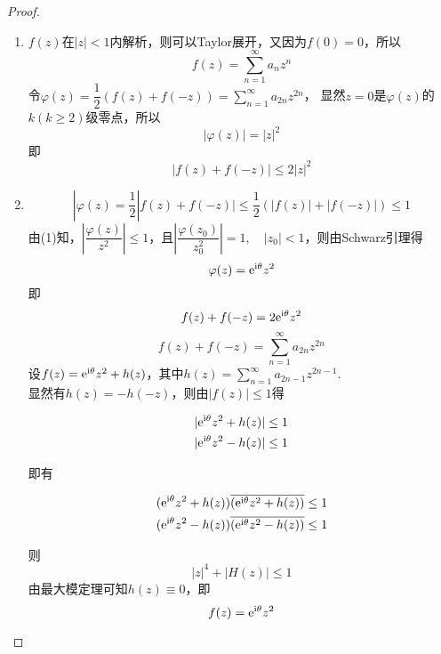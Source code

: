 \begin{proof}
    
    \begin{enumerate}
        
        \item
            $f(z)$在$|z| < 1$内解析，则可以\textup{Taylor}展开，又因为$f(0) = 0$，所以
            $$ f(z) = \sum\limits_{n = 1}^{\infty}{a_nz^n}$$
            令$\varphi(z) = \dfrac{1}{2} (f(z) + f(-z)) = \sum\limits_{n = 1}^{\infty}{a_{2n}z^{2n}}$，
            显然$z = 0$是$\varphi(z)$的$k(k \geq 2)$级零点，所以
            $$|\varphi(z)| = |z|^2$$
            即
            $$|f(z) + f(-z)| \leq 2|z|^2$$

        \item 
            $$|\varphi(z) = \dfrac{1}{2} |f(z) + f(-z)| \leq \dfrac{1}{2} (|f(z)| + |f(-z)|) \leq 1$$
            由\textup{(1)}知，$\left| \dfrac{\varphi(z)}{z^2} \right| \leq 1$，且$\left| \dfrac{\varphi(z_0)}{z_0^2} \right| = 1, \quad |z_0| < 1$，则由\textup{Schwarz}引理得
            $$\varphi(z) = \mathrm{e}^{\mathrm{i}\theta} z^2$$
            即
            $$f(z) + f(-z) = 2\mathrm{e}^{\mathrm{i}\theta} z^2$$
            $$f(z) + f(-z) = \sum\limits_{n = 1}^{\infty}{a_{2n}z^{2n}}$$
            设$f(z) = \mathrm{e}^{\mathrm{i}\theta} z^2 + h(z)$，其中$h(z) = \sum\limits_{n = 1}^{\infty}{a_{2n - 1}z^{2n - 1}}$. \\
            显然有$h(z) = -h(-z)$，则由$|f(z)| \leq 1$得

            \begin{align*}
                &|\mathrm{e}^{\mathrm{i}\theta} z^2 + h(z)| \leq 1 \\
                &|\mathrm{e}^{\mathrm{i}\theta} z^2 - h(z)| \leq 1
            \end{align*}

            即有

            \begin{align*}
                &(\mathrm{e}^{\mathrm{i}\theta} z^2 + h(z)) \overline{(\mathrm{e}^{\mathrm{i}\theta} z^2 + h(z))} \leq 1 \\
                &(\mathrm{e}^{\mathrm{i}\theta} z^2 - h(z)) \overline{(\mathrm{e}^{\mathrm{i}\theta} z^2 - h(z))} \leq 1
            \end{align*}

            则
            $$|z|^4 + |H(z)| \leq 1 $$
            由最大模定理可知$h(z)\equiv0$，即
            $$f(z) = \mathrm{e}^{\mathrm{i}\theta} z^2 $$

    \end{enumerate}

\end{proof}

